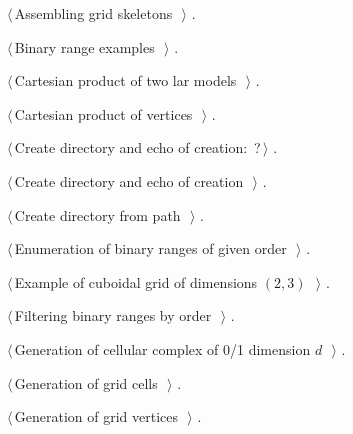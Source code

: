 \documentclass[11pt,oneside]{article}	%
\begin{document}
{\small\begin{list}{}{\setlength{\itemsep}{-\parsep}\setlength{\itemindent}{-\leftmargin}}
\item $\langle\,$Assembling grid skeletons\nobreak\ {\footnotesize {}}$\,\rangle$ {\footnotesize {\NWtxtRefIn} .}
\item $\langle\,$Binary range examples\nobreak\ {\footnotesize {}}$\,\rangle$ {\footnotesize {\NWtxtNoRef}.}
\item $\langle\,$Cartesian product of two lar models\nobreak\ {\footnotesize {}}$\,\rangle$ {\footnotesize {\NWtxtRefIn} .}
\item $\langle\,$Cartesian product of vertices\nobreak\ {\footnotesize {}}$\,\rangle$ {\footnotesize {\NWtxtRefIn} .}
\item $\langle\,$Create directory and echo of creation:\nobreak\ {\footnotesize ?}$\,\rangle$ {\footnotesize {\NWtxtRefIn} .}
\item $\langle\,$Create directory and echo of creation\nobreak\ {\footnotesize {}}$\,\rangle$ {\footnotesize {\NWtxtNoRef}.}
\item $\langle\,$Create directory from path\nobreak\ {\footnotesize {}}$\,\rangle$ {\footnotesize {\NWtxtRefIn} .
}
\item $\langle\,$Enumeration of binary ranges of given order\nobreak\ {\footnotesize {}}$\,\rangle$ {\footnotesize {\NWtxtRefIn} .}
\item $\langle\,$Example of cuboidal grid of dimensions $(2,3)$\nobreak\ {\footnotesize {}}$\,\rangle$ {\footnotesize {\NWtxtNoRef}.}
\item $\langle\,$Filtering binary ranges by order\nobreak\ {\footnotesize {}}$\,\rangle$ {\footnotesize {\NWtxtRefIn} .}
\item $\langle\,$Generation of cellular complex of 0/1 dimension $d$\nobreak\ {\footnotesize {}}$\,\rangle$ {\footnotesize {\NWtxtRefIn} .}
\item $\langle\,$Generation of grid cells\nobreak\ {\footnotesize {}}$\,\rangle$ {\footnotesize {\NWtxtRefIn} .}
\item $\langle\,$Generation of grid vertices\nobreak\ {\footnotesize {}}$\,\rangle$ {\footnotesize {\NWtxtRefIn} .}

\end{list}}
\end{document}
